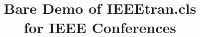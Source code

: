 \documentclass[conference]{IEEEtran}
\begin{document}
%
\title{Bare Demo of IEEEtran.cls\\ for IEEE Conferences}


\end{document}
